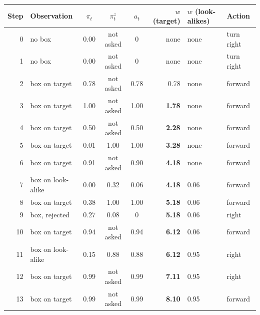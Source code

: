 \begin{tabular*}{\linewidth}{@{\extracolsep{\fill}}rlcccrll@{}}
\toprule
Step & Observation & $\pi_t$ & $\pi^z_t$ & $a_t$ & $w$ (target) & $w$ (look-alikes) & Action\\
\midrule
0 & no box & 0.00 & not asked & 0 & none & none & turn right\\
1 & no box & 0.00 & not asked & 0 & none & none & turn right\\
2 & box on target & 0.78 & not asked & 0.78 & 0.78 & none & forward\\
3 & box on target & 1.00 & not asked & 1.00 & \textbf{1.78} & none & forward\\
4 & box on target & 0.50 & not asked & 0.50 & \textbf{2.28} & none & forward\\
5 & box on target & 0.01 & 1.00 & 1.00 & \textbf{3.28} & none & forward\\
6 & box on target & 0.91 & not asked & 0.90 & \textbf{4.18} & none & forward\\
7 & box on look-alike & 0.00 & 0.32 & 0.06 & \textbf{4.18} & 0.06 & forward\\
8 & box on target & 0.38 & 1.00 & 1.00 & \textbf{5.18} & 0.06 & forward\\
9 & box, rejected & 0.27 & 0.08 & 0 & \textbf{5.18} & 0.06 & right\\
10 & box on target & 0.94 & not asked & 0.94 & \textbf{6.12} & 0.06 & forward\\
11 & box on look-alike & 0.15 & 0.88 & 0.88 & \textbf{6.12} & 0.95 & right\\
12 & box on target & 0.99 & not asked & 0.99 & \textbf{7.11} & 0.95 & right\\
13 & box on target & 0.99 & not asked & 0.99 & \textbf{8.10} & 0.95 & forward\\
\bottomrule
\end{tabular*}
